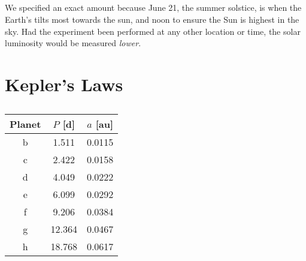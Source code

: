 \documentclass{article}
\begin{document}
\subsection{}

We specified an exact amount because June 21, the summer solstice, is when the Earth's tilts most towards the sun, and noon to ensure the Sun is highest in the sky.
Had the experiment been performed at any other location or time, the solar luminosity would be measured \emph{lower}.

\section{Kepler's Laws}

\subsection{}

\begin{center}
\begin{tabular}{||c|c|c||}
    \hline
    \textbf{Planet} & \(P\) [\si{\day}] & \(a\) [\si{\astronomicalunit}] \\
    \hline
    b & 1.511 & 0.0115 \\
    c & 2.422 & 0.0158 \\
    d & 4.049 & 0.0222 \\
    e & 6.099 & 0.0292 \\
    f & 9.206 & 0.0384 \\
    g & 12.364 & 0.0467 \\
    h & 18.768 & 0.0617 \\
    \hline
\end{tabular} \\
\end{center} 
\end{document}
